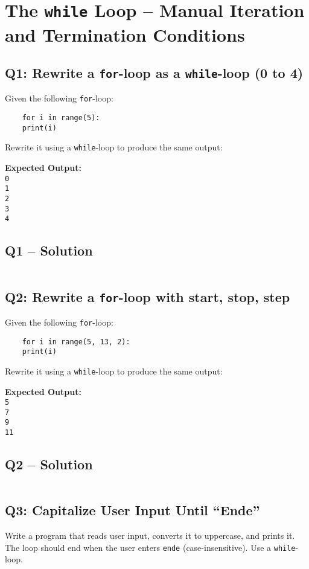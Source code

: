 \documentclass[a4paper,11pt]{article}
\begin{document}
\newpage
\section{The \texttt{while} Loop – Manual Iteration and Termination Conditions}

\subsection*{Q1: Rewrite a \texttt{for}-loop as a \texttt{while}-loop (0 to 4)}
Given the following \texttt{for}-loop:

\begin{verbatim}
	for i in range(5):
	print(i)
\end{verbatim}

Rewrite it using a \texttt{while}-loop to produce the same output:

\textbf{Expected Output:}\\
\texttt{0\\1\\2\\3\\4}

\subsection*{Q1 – Solution}
\inputminted{python}{Files/5/1.py}


\subsection*{Q2: Rewrite a \texttt{for}-loop with start, stop, step}
Given the following \texttt{for}-loop:

\begin{verbatim}
	for i in range(5, 13, 2):
	print(i)
\end{verbatim}

Rewrite it using a \texttt{while}-loop to produce the same output:

\textbf{Expected Output:}\\
\texttt{5\\7\\9\\11}


\subsection*{Q2 – Solution}
\inputminted{python}{Files/5/2.py}

\subsection*{Q3: Capitalize User Input Until “Ende”}
Write a program that reads user input, converts it to uppercase, and prints it. The loop should end when the user enters \texttt{ende} (case-insensitive). Use a \texttt{while}-loop.
\end{document}
